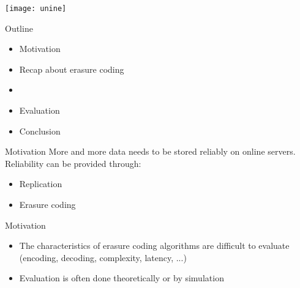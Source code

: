 {}




\begin{frame}[plain]
  
\titlepage

\begin{center}
\texttt{[image: unine]}
\end{center}

\end{frame}


\begin{frame}{Outline}
    \begin{itemize}
        \item Motivation
        \item Recap about erasure coding
        \item \sys
        \item Evaluation
        \item Conclusion
    \end{itemize}
\end{frame}

\subtitle[Introduction]{Introduction}

\begin{frame}{Motivation}
    More and more data needs to be stored reliably on online servers.
    Reliability can be provided through:
    \begin{itemize}
        \item<1> Replication
        \item<1-2> Erasure coding
    \end{itemize}
\end{frame}

\begin{frame}{Motivation}
  \begin{itemize}
  \item The characteristics of erasure coding algorithms are difficult to evaluate (encoding, decoding, complexity, latency, ...)
  \item Evaluation is often done theoretically or by simulation
  \end{itemize}

\end{frame}

